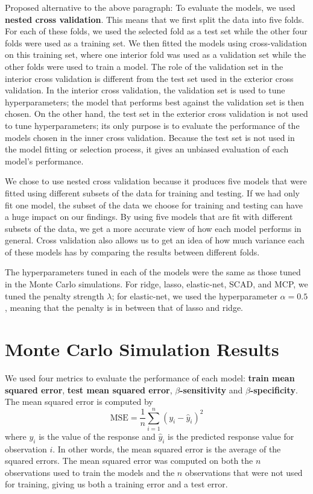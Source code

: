 \documentclass{article}
\begin{document}
Proposed alternative to the above paragraph: To evaluate the models, we used \textbf{nested cross validation}. This means that we first split the data into five folds. For each of these folds, we used the selected fold as a test set while the other four folds were used as a training set. We then fitted the models using cross-validation on this training set, where one interior fold was used as a validation set while the other folds were used to train a model. The role of the validation set in the interior cross validation is different from the test set used in the exterior cross validation. In the interior cross validation, the validation set is used to tune hyperparameters; the model that performs best against the validation set is then chosen. On the other hand, the test set in the exterior cross validation is not used to tune hyperparameters; its only purpose is to evaluate the performance of the models chosen in the inner cross validation. Because the test set is not used in the model fitting or selection process, it gives an unbiased evaluation of each model's performance.

We chose to use nested cross validation because it produces five models that were fitted using different subsets of the data for training and testing. If we had only fit one model, the subset of the data we choose for training and testing can have a huge impact on our findings. By using five models that are fit with different subsets of the data, we get a more accurate view of how each model performs in general. Cross validation also allows us to get an idea of how much variance each of these models has by comparing the results between different folds.

The hyperparameters tuned in each of the models were the same as those tuned in the Monte Carlo simulations. For ridge, lasso, elastic-net, SCAD, and MCP, we tuned the penalty strength $\lambda$; for elastic-net, we used the hyperparameter $\alpha = 0.5$, meaning that the penalty is in between that of lasso and ridge. 



\section{Monte Carlo Simulation Results}

We used four metrics to evaluate the performance of each model: \textbf{train mean squared error}, \textbf{test mean squared error}, \textbf{$\beta$-sensitivity} and \textbf{$\beta$-specificity}. The mean squared error is computed by
\begin{equation}
	\text{MSE} = \frac{1}{n}\sum\limits_{i = 1}^n (y_i - \hat{y}_i)^2
\end{equation}
where $y_i$ is the value of the response and $\hat{y}_i$ is the predicted response value for observation $i$. In other words, the mean squared error is the average of the squared errors. The mean squared error was computed on both the $n$ observations used to train the models and the $n$ observations that were not used for training, giving us both a training error and a test error.
\end{document}
